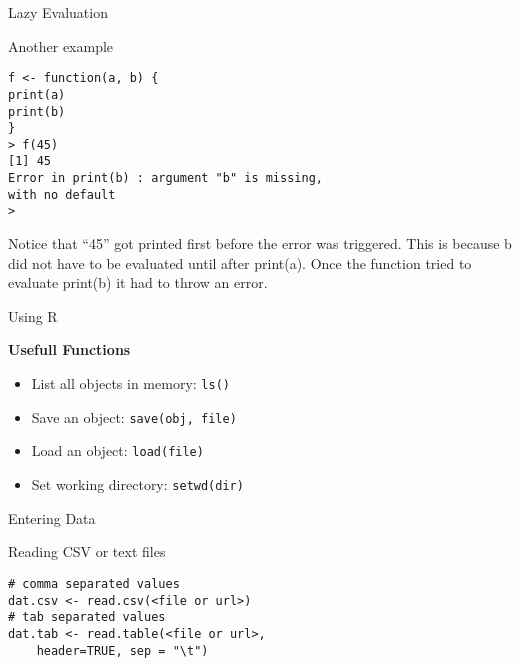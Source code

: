 \begin{frame}[fragile]{Lazy Evaluation}

Another example

\begin{verbatim}
f <- function(a, b) {
print(a)
print(b)
}
> f(45)
[1] 45
Error in print(b) : argument "b" is missing, 
with no default
>
\end{verbatim}

Notice that ``45'' got printed first before the error was triggered.
This is because b did not have to be evaluated until after print(a).
Once the function tried to evaluate print(b) it had to throw an error.

\end{frame}

\begin{frame}{Using R}

\begin{block}{\textbf{Usefull Functions}}

\begin{itemize}
\item
  List all objects in memory: \texttt{ls()}
\item
  Save an object: \texttt{save(obj,\ file)}
\item
  Load an object: \texttt{load(file)}
\item
  Set working directory: \texttt{setwd(dir)}
\end{itemize}

\end{block}

\end{frame}

\begin{frame}[fragile]{Entering Data}

\begin{block}{Reading CSV or text files}

\begin{verbatim}
# comma separated values
dat.csv <- read.csv(<file or url>)
# tab separated values
dat.tab <- read.table(<file or url>, 
    header=TRUE, sep = "\t")
\end{verbatim}

\end{block}

\end{frame}

